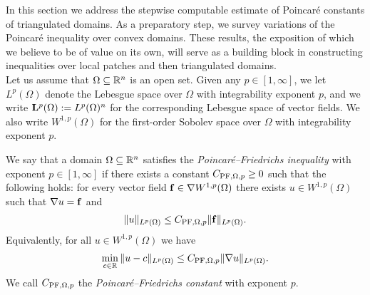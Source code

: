 \documentclass[a4paper]{article}
\begin{document}
In this section we address the stepwise computable estimate of Poincar\'e constants of triangulated domains. As a preparatory step, we survey variations of the Poincar\'e inequality over convex domains. These results, the exposition of which we believe to be of value on its own, will serve as a building block in constructing inequalities over local patches and then triangulated domains.
\\

Let us assume that $\Omega \subseteq {\mathbb R}^{n}$ is an open set. 
Given any $p \in [1,\infty]$, we let $L^p(\Omega)$ denote the Lebesgue space over $\Omega$ with integrability exponent $p$, and we write ${\mathbf L}^p(\Omega) := L^p(\Omega)^n$ for the corresponding Lebesgue space of vector fields. 
We also write $W^{1,p}(\Omega)$ for the first-order Sobolev space over $\Omega$ with integrability exponent $p$. 

We say that a domain $\Omega \subseteq {\mathbb R}^{n}$ satisfies the \emph{Poincar\'e--Friedrichs inequality} with exponent $p \in [1,\infty]$
if there exists a constant $C_{{\rm PF},\Omega,p} \geq 0$ such that the following holds:
for every vector field ${\mathbf f} \in \nabla W^{1,p}(\Omega)$ there exists $u \in W^{1,p}(\Omega)$
such that $\nabla u = {\mathbf f}$ and 
\begin{align}\label{math:inequalitypf:gradient}
    \| u \|_{L^{p}(\Omega)}
    \leq 
    C_{{\rm PF},\Omega,p} 
    \| {\mathbf f} \|_{L^{p}(\Omega)}
    .
\end{align}
Equivalently, for all $u \in W^{1,p}(\Omega)$ we have 
\begin{align}
    \min_{ c \in {\mathbb R} } \| u - c \|_{L^{p}(\Omega)}
    \leq 
    C_{{\rm PF},\Omega,p} 
    \| \nabla u \|_{L^{p}(\Omega)}
    .
\end{align}
We call $C_{{\rm PF},\Omega,p}$ the \emph{Poincar\'e--Friedrichs constant} with exponent $p$. 
\end{document}
